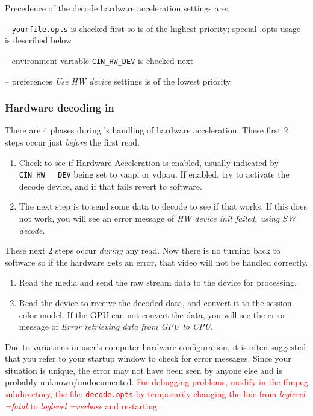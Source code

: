 Precedence of the decode hardware acceleration settings are:

-- \texttt{yourfile.opts} is checked first so is of the highest priority; special .opts usage is described below

-- environment variable \texttt{CIN\_HW\_DEV} is checked next

-- preferences \textit{Use HW device} settings is of the lowest priority

\subsubsection*{Hardware decoding in \CGG{}}%
\label{ssub:hardware_decoding_cinelerra}

There are 4 phases during \CGG{}’s handling of hardware acceleration. These first 2 steps occur just \textit{before} the first read.

\begin{enumerate}
	\item Check to see if Hardware Acceleration is enabled, usually indicated by \texttt{CIN\_HW\_ \_DEV} being set to
	vaapi or vdpau.  If enabled, try to activate the decode device, and if that fails revert to software.
	\item The next step is to send some data to decode to see if that works. If this does not work, you will see
	an error message of \textit{HW device init failed, using SW decode}.
\end{enumerate}

\noindent These next 2 steps occur \textit{during} any read.  Now there is no turning back to software so if the hardware gets an error, that video will not be handled correctly.

\begin{enumerate} [resume]
	\item Read the media and send the raw stream data to the device for processing.
	\item Read the device to receive the decoded data, and convert it to the session color model.  If the GPU
	can not convert the data, you will see the error message of \textit{Error retrieving data from GPU to CPU}.
\end{enumerate}

Due to variations in user’s computer hardware configuration, it is often suggested that you refer to your startup window to check for error messages.   Since your situation is unique, the error may not have been seen by anyone else and is probably unknown/undocumented.
\textcolor{red}{For debugging problems, modify in the \CGG{} ffmpeg subdirectory, the file:  \texttt{decode.opts}   by temporarily changing the line from \textit{loglevel =fatal} to \textit{loglevel =verbose} and restarting \CGG{}}.  

